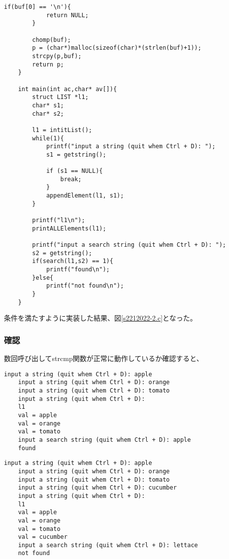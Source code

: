 \documentclass[fontsize = 10pt, paper= a4,twocolumn,column_gap=3zw]{jlreq}
\begin{document}
\begin{lstlisting}[basicstyle=\ttfamily\footnotesize, frame=single, caption=s2212022-2.c ,label=s2212022-2.c]
        if(buf[0] == '\n'){
            return NULL;
        }

        chomp(buf);
        p = (char*)malloc(sizeof(char)*(strlen(buf)+1));
        strcpy(p,buf);
        return p;
    }    

    int main(int ac,char* av[]){
        struct LIST *l1;
        char* s1;
        char* s2;

        l1 = intitList();
        while(1){
            printf("input a string (quit whem Ctrl + D): ");
            s1 = getstring();

            if (s1 == NULL){
                break;
            }
            appendElement(l1, s1);
        }

        printf("l1\n");
        printALLElements(l1);

        printf("input a search string (quit whem Ctrl + D): ");
        s2 = getstring();
        if(search(l1,s2) == 1){
            printf("found\n");
        }else{
            printf("not found\n");
        }
    }    
\end{lstlisting}

条件を満たすように実装した結果、図\ref{s2212022-2.c}となった。

\subsubsection{確認}
数回呼び出してstrcmp関数が正常に動作しているか確認すると、
\begin{lstlisting}[basicstyle=\ttfamily\footnotesize, frame=single, caption=test3,label=test3]
    input a string (quit whem Ctrl + D): apple
    input a string (quit whem Ctrl + D): orange
    input a string (quit whem Ctrl + D): tomato
    input a string (quit whem Ctrl + D):
    l1
    val = apple
    val = orange
    val = tomato
    input a search string (quit whem Ctrl + D): apple
    found    
\end{lstlisting}

\begin{lstlisting}[basicstyle=\ttfamily\footnotesize, frame=single, caption=test4,label=test4]
    input a string (quit whem Ctrl + D): apple
    input a string (quit whem Ctrl + D): orange
    input a string (quit whem Ctrl + D): tomato
    input a string (quit whem Ctrl + D): cucumber
    input a string (quit whem Ctrl + D):
    l1
    val = apple
    val = orange
    val = tomato
    val = cucumber
    input a search string (quit whem Ctrl + D): lettace
    not found    
\end{lstlisting}
\end{document}
